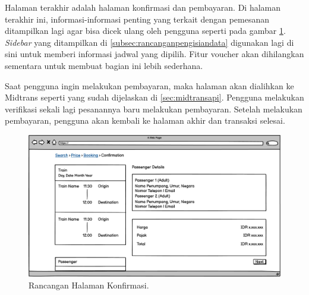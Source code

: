Halaman terakhir adalah halaman konfirmasi dan pembayaran. Di halaman terakhir ini, informasi-informasi penting yang terkait dengan pemesanan ditampilkan lagi agar bisa dicek ulang oleh pengguna seperti pada gambar \ref{img:rancangankonfirmasi}. \textit{Sidebar} yang ditampilkan di \ref{subsec:rancanganpengisiandata} digunakan lagi di sini untuk memberi informasi jadwal yang dipilih. Fitur voucher akan dihilangkan sementara untuk membuat bagian ini lebih sederhana.

Saat pengguna ingin melakukan pembayaran, maka halaman akan dialihkan ke Midtrans seperti yang sudah dijelaskan di \ref{sec:midtransapi}. Pengguna melakukan verifikasi sekali lagi pesanannya baru melakukan pembayaran. Setelah melakukan pembayaran, pengguna akan kembali ke halaman akhir dan transaksi selesai.

\begin{figure}[H]
\center
\includegraphics[width=\textwidth,height=\textheight,keepaspectratio]{Gambar/Halaman Konfirmasi.png}
\caption{Rancangan Halaman Konfirmasi.}
    \label{img:rancangankonfirmasi}
\end{figure}
